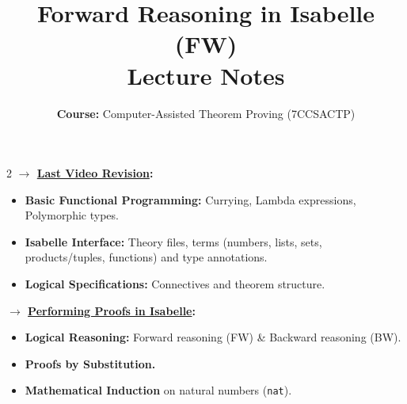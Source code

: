 \documentclass[10pt,a4paper]{article}
\title{\textbf{\huge Forward Reasoning in Isabelle (FW)}\\[0.3em]
\large Lecture Notes}
\author{\textbf{Course:} Computer-Assisted Theorem Proving (7CCSACTP)}
\date{}
\begin{document}
\maketitle
\vspace{-1.5em}

\begin{tcolorbox}[title={1. Context \& Overview}]
\begin{multicols}{2}
\textbf{$\rightarrow$ \underline{Last Video Revision}:}
\begin{itemize}[leftmargin=1.2em, itemsep=2pt]
    \item \textbf{Basic Functional Programming:} Currying, Lambda expressions, Polymorphic types.
    \item \textbf{Isabelle Interface:} Theory files, terms (numbers, lists, sets, products/tuples, functions) and type annotations.
    \item \textbf{Logical Specifications:} Connectives and theorem structure.
\end{itemize}

\columnbreak

\textbf{$\rightarrow$ \underline{Performing Proofs in Isabelle}:}
\begin{itemize}[leftmargin=1.2em, itemsep=2pt]
    \item \textbf{Logical Reasoning:} Forward reasoning (FW) \& Backward reasoning (BW).
    \item \textbf{Proofs by Substitution.}
    \item \textbf{Mathematical Induction} on natural numbers (\texttt{nat}).
\end{itemize}
\end{multicols}
\end{tcolorbox}

\vspace{0.3em}
\end{document}
